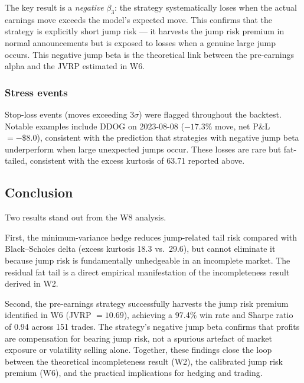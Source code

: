 \documentclass[12pt]{article}
\begin{document}
The key result is a \emph{negative} $\beta_3$: the strategy
systematically loses when the actual earnings move exceeds the model's
expected move.
This confirms that the strategy is explicitly short jump risk — it
harvests the jump risk premium in normal announcements but is exposed to
losses when a genuine large jump occurs.
This negative jump beta is the theoretical link between the pre-earnings
alpha and the JVRP estimated in W6.

\subsubsection*{Stress events}

Stop-loss events (moves exceeding $3\sigma$) were flagged throughout the
backtest.
Notable examples include DDOG on 2023-08-08 ($-17.3\%$ move, net
P\&L $= -\$8.0$), consistent with the prediction that strategies with
negative jump beta underperform when large unexpected jumps occur.
These losses are rare but fat-tailed, consistent with the excess kurtosis
of 63.71 reported above.

\subsection*{Conclusion}

Two results stand out from the W8 analysis.

First, the minimum-variance hedge reduces jump-related tail risk compared
with Black--Scholes delta (excess kurtosis 18.3 vs.\ 29.6), but cannot
eliminate it because jump risk is fundamentally unhedgeable in an
incomplete market.
The residual fat tail is a direct empirical manifestation of the
incompleteness result derived in W2.

Second, the pre-earnings strategy successfully harvests the jump risk
premium identified in W6 (JVRP $= 10.69$), achieving a 97.4\% win rate
and Sharpe ratio of 0.94 across 151 trades.
The strategy's negative jump beta confirms that profits are compensation
for bearing jump risk, not a spurious artefact of market exposure or
volatility selling alone.
Together, these findings close the loop between the theoretical
incompleteness result (W2), the calibrated jump risk premium (W6), and
the practical implications for hedging and trading.
\end{document}
